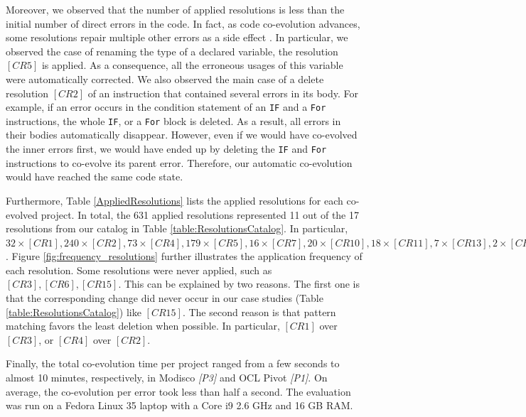 Moreover, we observed that the number of applied resolutions is less than the initial number of direct errors in the code. In fact, as code co-evolution advances, some resolutions repair multiple other errors as a side effect \cite{cuadrado2018quick,khelladi2019detecting}. 
In particular, we observed the case of renaming the type of a declared variable, the resolution $[CR5]$ is applied. As a consequence, all the erroneous usages of this variable were automatically corrected. We also observed the main case of a delete resolution $[CR2]$ of an instruction that contained several errors in its body.
For example, if an error occurs in the condition statement of an \texttt{IF} and a \texttt{For} instructions, the whole \texttt{IF}, or a \texttt{For} block is deleted. As a result, all errors in their bodies automatically disappear. However, even if we would have co-evolved the inner errors first, we would have ended up by deleting the \texttt{IF} and \texttt{For} instructions to co-evolve its parent error. Therefore, our automatic co-evolution would have reached the same code state. 

Furthermore, Table \ref{AppliedResolutions} lists the applied resolutions for each co-evolved project. In total, the 631 applied resolutions represented 11 out of the 17 resolutions from our catalog in Table \ref{table:ResolutionsCatalog}. 
In particular, $32 \times [CR1], 240 \times [CR2], 73 \times [CR4], 179 \times [CR5], 16 \times [CR7], 20 \times [CR10], 18 \times [CR11], 7 \times [CR13], 2 \times [CR14], 3 \times [CR16], 13 \times [CR17]$. 
%
Figure \ref{fig:frequency_resolutions} further illustrates the application frequency of each resolution. Some resolutions were never applied, such as $[CR3], [CR6], [CR15]$. This can be explained by two reasons. The first one is that the corresponding change did never occur in our case studies (Table \ref{table:ResolutionsCatalog}) like $[CR15]$. The second reason is that pattern matching favors the least deletion when possible. In particular, $[CR1]$ over $[CR3]$, or $[CR4]$ over $[CR2]$.


Finally, the total co-evolution time per project ranged from a few seconds to almost 10 minutes, respectively, in Modisco  \emph{[P3]} and OCL Pivot \emph{[P1]}. On average, the co-evolution per error took less than half a second. The evaluation was run on a Fedora Linux 35 laptop with a Core i9 2.6 GHz and 16 GB RAM.


